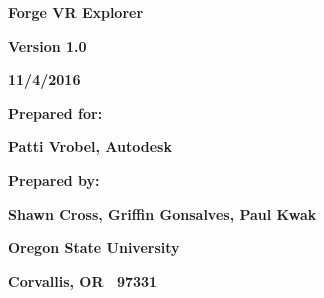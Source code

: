 \documentclass[letterpaper, 10pt, draftclsnofoot, compsoc, onecolumn]{IEEEtran}
\begin{document}
{\centering{}\bfseries\color{black}
Forge VR Explorer
\par}


\bigskip


\bigskip


\bigskip

\begin{figure}
\centering
\end{figure}

\bigskip


\bigskip

{\centering{}\bfseries\color{black}
Version 1.0
\par}

{\centering{}\bfseries\color{black}
11/4/2016
\par}


\bigskip


\bigskip

{\centering{}\bfseries\color{black}
Prepared for:
\par}

{\centering{}\bfseries\color{black}
Patti Vrobel, Autodesk
\par}


\bigskip


\bigskip

{\centering{}\bfseries\color{black}
Prepared by:  
\par}

{\centering{}\bfseries\color{black}
Shawn Cross, Griffin Gonsalves, Paul Kwak
\par}

{\centering{}\bfseries\color{black}
Oregon State University
\par}

{\centering{}\bfseries\color{black}
Corvallis, OR \ 97331
\par}



\end{document}

